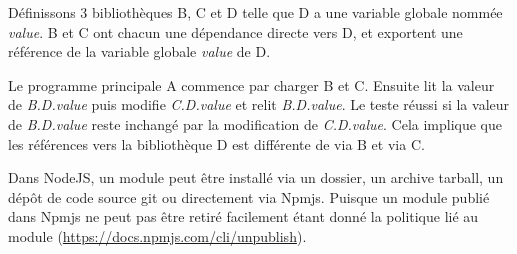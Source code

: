 \documentclass[12pt,initial,twoside,maitrise]{dms}
\numberwithin{equation}{section}
\numberwithin{table}{chapter}
\numberwithin{figure}{chapter}
\begin{document}
Définissons 3 bibliothèques B, C et D telle que D a une variable globale nommée \textit{value}.
B et C ont chacun une dépendance directe vers D, et exportent une référence de la variable
globale \textit{value} de D.

Le programme principale A commence par charger B et C. Ensuite lit la valeur de \textit{B.D.value}
puis modifie \textit{C.D.value} et relit \textit{B.D.value}. Le teste réussi si la valeur de
\textit{B.D.value} reste inchangé par la modification de \textit{C.D.value}. Cela implique que
les références vers la bibliothèque D est différente de via B et via C.

Dans NodeJS, un module peut être installé via un dossier, un archive tarball, un dépôt de code source git ou
directement via Npmjs. Puisque un module publié dans Npmjs ne peut pas être retiré facilement étant donné
la politique lié au module (\url{https://docs.npmjs.com/cli/unpublish}).
\end{document}
